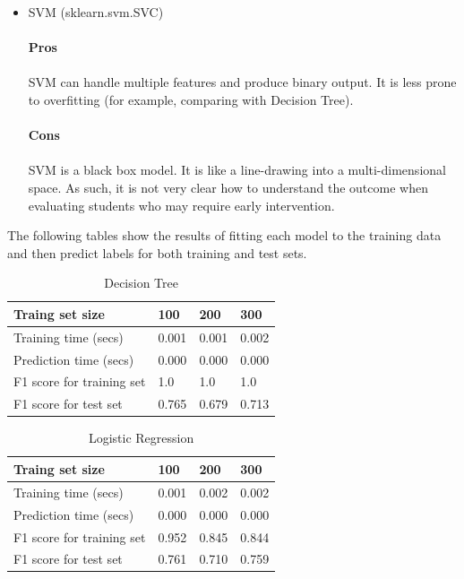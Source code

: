 \documentclass{article}
\begin{document}
\begin{itemize}
\item SVM (sklearn.svm.SVC)
\\\\
\textbf{Pros} \\\\
SVM can handle multiple features and produce binary output.  It is less prone to overfitting (for example, comparing with Decision Tree).
\\\\
\textbf{Cons} \\
\\
SVM is a black box model.  It is like a line-drawing into a multi-dimensional space.  As such, it is not very clear how to understand the outcome when evaluating students who may require early intervention.\\
\end{itemize}
The following tables show the results of fitting each model to the training data and then predict labels for both training and test sets.
\begin{table}[H]
\centering
\begin{tabular}{| l | l | l | l |}
\hline
Traing set size           &  100 & 200 & 300 \\
\hline
Training time (secs)      & 0.001 & 0.001 & 0.002 \\
\hline
Prediction time (secs)    & 0.000 & 0.000 & 0.000 \\
\hline
F1 score for training set & 1.0  & 1.0  & 1.0  \\
\hline
F1 score for test set     & 0.765 & 0.679 & 0.713 \\
\hline
\end{tabular}
\caption{Decision Tree}
\end{table}

\begin{table}[H]
\centering
\begin{tabular}{| l | l | l | l |}
\hline
Traing set size           & 100 & 200 & 300 \\
\hline
Training time (secs)    & 0.001 & 0.002 & 0.002 \\
\hline
Prediction time (secs)  & 0.000 & 0.000 & 0.000 \\
\hline
F1 score for training set & 0.952 & 0.845 & 0.844 \\
\hline
F1 score for test set    & 0.761 & 0.710 & 0.759 \\
\hline
\end{tabular}
\caption{Logistic Regression}
\end{table}
\end{document}
